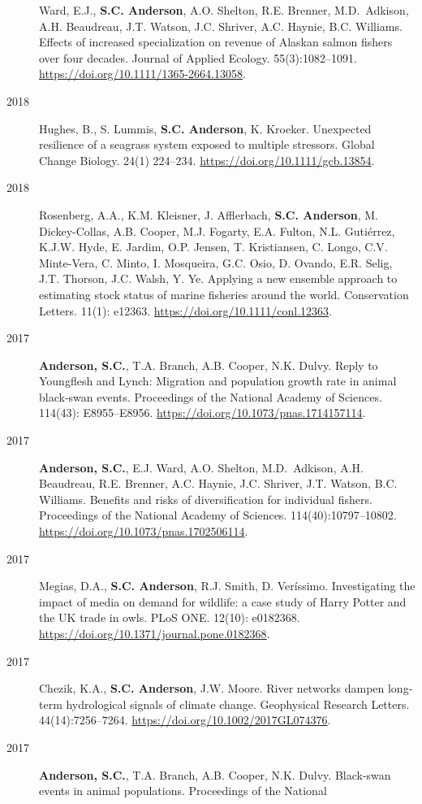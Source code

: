 \begin{description}
Ward, E.J., \textbf{S.C. Anderson}, A.O. Shelton, R.E. Brenner,
M.D.\ Adkison, A.H. Beaudreau, J.T. Watson, J.C. Shriver, A.C. Haynie,
B.C. Williams. Effects of increased specialization on revenue of Alaskan
salmon fishers over four decades. Journal of Applied Ecology.
55(3):1082--1091. \url{https://doi.org/10.1111/1365-2664.13058}.
\item[2018]
Hughes, B., S. Lummis, \textbf{S.C. Anderson}, K. Kroeker. Unexpected
resilience of a seagrass system exposed to multiple stressors. Global
Change Biology. 24(1) 224--234. \url{https://doi.org/10.1111/gcb.13854}.
\item[2018]
Rosenberg, A.A., K.M. Kleisner, J. Afflerbach, \textbf{S.C. Anderson},
M. Dickey-Collas, A.B. Cooper, M.J. Fogarty, E.A. Fulton, N.L.
Gutiérrez, K.J.W. Hyde, E. Jardim, O.P. Jensen, T. Kristiansen, C.
Longo, C.V. Minte-Vera, C. Minto, I. Mosqueira, G.C. Osio, D. Ovando,
E.R. Selig, J.T. Thorson, J.C. Walsh, Y. Ye. Applying a new ensemble
approach to estimating stock status of marine fisheries around the
world. Conservation Letters. 11(1): e12363.
\url{https://doi.org/10.1111/conl.12363}.
\item[2017]
\textbf{Anderson, S.C.}, T.A. Branch, A.B. Cooper, N.K. Dulvy. Reply to
Youngflesh and Lynch: Migration and population growth rate in animal
black-swan events. Proceedings of the National Academy of Sciences.
114(43): E8955--E8956. \url{https://doi.org/10.1073/pnas.1714157114}.
\item[2017]
\textbf{Anderson, S.C.}, E.J. Ward, A.O. Shelton, M.D.\ Adkison, A.H.
Beaudreau, R.E. Brenner, A.C. Haynie, J.C. Shriver, J.T. Watson, B.C.
Williams. Benefits and risks of diversification for individual fishers.
Proceedings of the National Academy of Sciences. 114(40):10797--10802.
\url{https://doi.org/10.1073/pnas.1702506114}.
\item[2017]
Megias, D.A., \textbf{S.C. Anderson}, R.J. Smith, D. Veríssimo.
Investigating the impact of media on demand for wildlife: a case study
of Harry Potter and the UK trade in owls. PLoS ONE. 12(10): e0182368.
\url{https://doi.org/10.1371/journal.pone.0182368}.
\item[2017]
Chezik, K.A., \textbf{S.C. Anderson}, J.W. Moore. River networks dampen
long-term hydrological signals of climate change. Geophysical Research
Letters. 44(14):7256--7264. \url{https://doi.org/10.1002/2017GL074376}.
\item[2017]
\textbf{Anderson, S.C.}, T.A. Branch, A.B. Cooper, N.K. Dulvy.
Black-swan events in animal populations. Proceedings of the National

\end{description}
